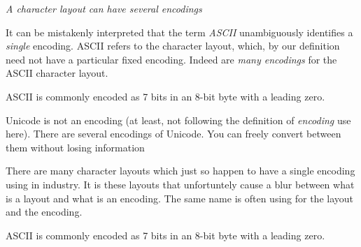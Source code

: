 \begin{figure}[h]
\end{figure} 

\frmrule 

\textit{A character layout can have several encodings}

It can be mistakenly interpreted that the term \textit{ASCII} 
unambiguously identifies a \textit{single} encoding. ASCII refers to the 
character layout, which, by our definition need not have a particular fixed encoding.
Indeed are \textit{many encodings} for the ASCII character layout. 

\begin{example}
ASCII is commonly encoded as 7 bits in an 8-bit byte with a leading zero. 
\end{example}

\begin{example}
Unicode is not an encoding (at least, not following the definition of \textit{encoding} use here).
There are several encodings of Unicode. 
You can freely convert between them without losing information
\end{example}



There are many character layouts which just so happen to have a single 
encoding using in industry. It is these layouts that unfortuntely 
cause a blur between what is a layout and what is an encoding. 
The same name is often using for the layout and the encoding. 

\begin{example}
ASCII is commonly encoded as 7 bits in an 8-bit byte with a leading zero. 
\end{example}

